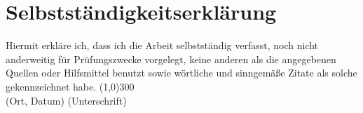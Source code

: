 \section*{Selbstständigkeitserklärung}

Hiermit erkläre ich, dass ich die Arbeit selbstständig verfasst, noch nicht anderweitig für Prüfungszwecke vorgelegt, keine anderen 
als die angegebenen Quellen oder Hilfsmittel benutzt sowie wörtliche und sinngemäße Zitate als solche gekennzeichnet habe.
\newline
\newline
\newline
\line(1,0){300} \\
(Ort, Datum) \qquad \qquad  (Unterschrift)
